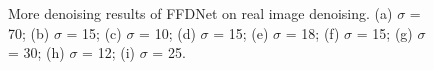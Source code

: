 \documentclass[journal]{IEEEtran}
\begin{document}
\begin{figure}[!htbp]
\begin{center}
\caption{More denoising results of FFDNet on real image denoising. (a) $\sigma$ = 70; (b) $\sigma$ = 15; (c) $\sigma$ = 10; (d) $\sigma$ = 15; (e) $\sigma$ = 18; (f) $\sigma$ = 15; (g) $\sigma$ = 30;  (h) $\sigma$ = 12; (i) $\sigma$ = 25.}\label{fig_rn3}
\end{center}%
\end{figure}
\end{document}
